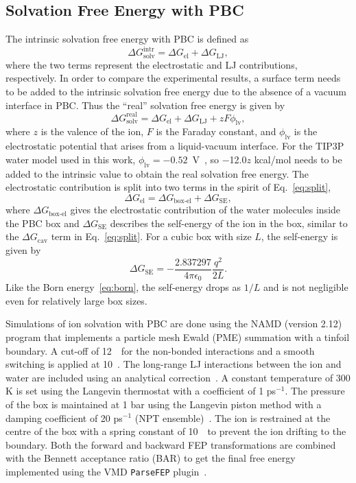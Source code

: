 \subsection{Solvation Free Energy with PBC}
The intrinsic solvation free energy with PBC is defined as 
\begin{equation}
\Delta G_{\text{solv}}^{\text{intr}} = \Delta G_{\text{el}} + \Delta G_{\text{LJ}},
\end{equation}
where the two terms represent the electrostatic and LJ contributions, respectively. In order to compare 
the experimental results, a surface term needs to be added to the intrinsic solvation free energy due to 
the absence of a vacuum interface in PBC. Thus the “real” solvation free energy is given by~\cite{Lin2014a}
\begin{equation}
\Delta G_{\text{solv}}^{\text{real}} = \Delta G_{\text{el}} + \Delta G_{\text{LJ}} + zF\phi_{\text{lv}},
\end{equation}
where $z$ is the valence of the ion, $F$ is the Faraday constant, and $\phi_{\text{lv}}$ is the 
electrostatic potential that arises from a liquid-vacuum interface.  For the TIP3P water model used in 
this work, $\phi_{\text{lv}}=-0.52$~V~\cite{Lin2014a}, so $-$12.0$z$ kcal/mol needs to be added to the 
intrinsic value to obtain the real solvation free energy. The electrostatic contribution is split into 
two terms in the spirit of Eq.~\eqref{eq:split},
\begin{equation}
\Delta G_{\text{el}} = \Delta G_{\text{box-el}} + \Delta G_{\text{SE}},
\end{equation}
where $\Delta G_{\text{box-el}}$ gives the electrostatic contribution of the water molecules inside 
the PBC box and $\Delta G_{\text{SE}}$ describes the self-energy of the ion in the box, similar to the 
$\Delta G_{\text{cav}}$ term in Eq.~\eqref{eq:split}. For  a cubic box with size $L$, the self-energy 
is given by~\cite{Hummer1996}
\begin{equation}
\Delta G_{\text{SE}} = -\frac{2.837297}{4\pi\epsilon_{0}}\frac{q^2}{2L}.
\end{equation}
Like the Born energy~\eqref{eq:born}, the self-energy drops as $1/L$ and is not negligible even for 
relatively large box sizes. 

Simulations of ion solvation with PBC are done using the NAMD (version 2.12)~\cite{Phillips2005} program 
that implements a particle mesh Ewald (PME) summation with a tinfoil boundary. A cut-off of 12~\angs\ for 
the non-bonded interactions and a smooth switching is applied at 10~\angs. The long-range LJ interactions 
between the ion and water are included using an analytical correction~\cite{Shirts2007}. A constant 
temperature of 300 K is set using the Langevin thermostat with a coefficient of 1 ps$^{-1}$. The pressure 
of the box is maintained at 1 bar using the Langevin piston method with a damping coefficient of 20 
ps$^{-1}$ (NPT ensemble)~\cite{Feller1995}. The ion is restrained at the centre of the box with a spring 
constant of 10~\spring\ to prevent the ion drifting to the boundary. Both the forward and backward FEP 
transformations are combined with the Bennett acceptance ratio (BAR) to get the final free energy 
implemented using the VMD \verb+ParseFEP+ plugin~\cite{Liu2012}. 

